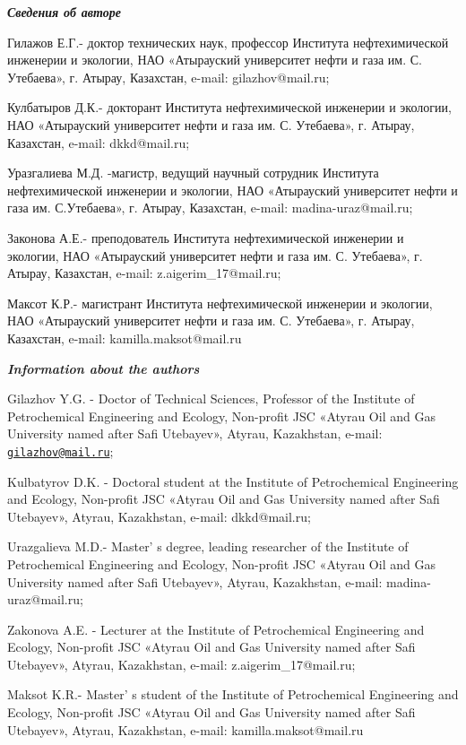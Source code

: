 \begin{authorinfo}
\hspace{1em}\emph{{\bfseries Сведения об авторе}}

Гилажов Е.Г.- доктор технических наук, профессор Института
нефтехимической инженерии и экологии, НАО «Атырауский университет нефти
и газа им. С. Утебаева», г. Атырау, Казахстан, e-mail: gilazhov@mail.ru;

Кулбатыров Д.К.- докторант Института нефтехимической инженерии и
экологии, НАО «Атырауский университет нефти и газа им. С. Утебаева», г.
Атырау, Казахстан, e-mail: dkkd@mail.ru;

Уразгалиева М.Д. -магистр, ведущий научный сотрудник Института
нефтехимической инженерии и экологии, НАО «Атырауский университет нефти
и газа им. С.Утебаева», г. Атырау, Казахстан, e-mail:
madina-uraz@mail.ru;

Законова А.Е.- преподователь Института нефтехимической инженерии и
экологии, НАО «Атырауский университет нефти и газа им. С. Утебаева», г.
Атырау, Казахстан, e-mail: z.aigerim\_17@mail.ru;

Максот К.Р.- магистрант Института нефтехимической инженерии и экологии,
НАО «Атырауский университет нефти и газа им. С. Утебаева», г. Атырау,
Казахстан, e-mail: kamilla.maksot@mail.ru

\hspace{1em}\emph{{\bfseries Information about the authors}}

Gilazhov Y.G. - Doctor of Technical Sciences, Professor of the Institute
of Petrochemical Engineering and Ecology, Non-profit JSC «Atyrau Oil and
Gas University named after Safi Utebayev», Atyrau, Kazakhstan, e-mail:
\href{mailto:gilazhov@mail.ru}{\nolinkurl{gilazhov@mail.ru}};

Kulbatyrov D.K. - Doctoral student at the Institute of Petrochemical
Engineering and Ecology, Non-profit JSC «Atyrau Oil and Gas University
named after Safi Utebayev», Atyrau, Kazakhstan, e-mail: dkkd@mail.ru;

Urazgalieva M.D.- Master' s degree, leading researcher of
the Institute of Petrochemical Engineering and Ecology, Non-profit JSC
«Atyrau Oil and Gas University named after Safi Utebayev», Atyrau,
Kazakhstan, e-mail: madina-uraz@mail.ru;

Zakonova A.E. - Lecturer at the Institute of Petrochemical Engineering
and Ecology, Non-profit JSC «Atyrau Oil and Gas University named after
Safi Utebayev», Atyrau, Kazakhstan, e-mail: z.aigerim\_17@mail.ru;

Maksot K.R.- Master' s student of the Institute of
Petrochemical Engineering and Ecology, Non-profit JSC «Atyrau Oil and
Gas University named after Safi Utebayev», Atyrau, Kazakhstan, e-mail:
kamilla.maksot@mail.ru
\end{authorinfo}
